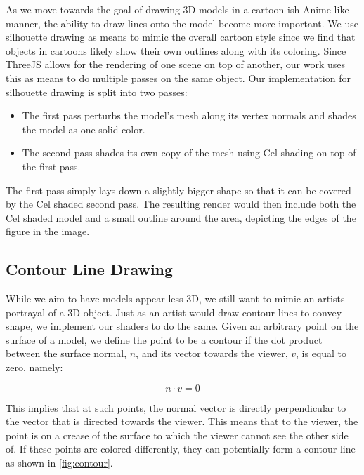 \documentclass[10pt,twocolumn,letterpaper]{article}
\begin{document}
As we move towards the goal of drawing 3D models in a cartoon-ish Anime-like manner, the ability to draw lines onto the model become more important. We use silhouette drawing as means to mimic the overall cartoon style since we find that objects in cartoons likely show their own outlines along with its coloring. Since ThreeJS allows for the rendering of one scene on top of another, our work uses this as means to do multiple passes on the same object. Our implementation for silhouette drawing is split into two passes:

\begin{itemize}
    \item The first pass perturbs the model's mesh along its vertex normals and shades the model as one solid color.
    \item The second pass shades its own copy of the mesh using Cel shading on top of the first pass.
\end{itemize}

The first pass simply lays down a slightly bigger shape so that it can be covered by the Cel shaded second pass. The resulting render would then include both the Cel shaded model and a small outline around the area, depicting the edges of the figure in the image.

\subsection{Contour Line Drawing}

While we aim to have models appear less 3D, we still want to mimic an artists portrayal of a 3D object. Just as an artist would draw contour lines to convey shape, we implement our shaders to do the same. Given an arbitrary point on the surface of a model, we define the point to be a contour if the dot product between the surface normal, $n$, and its vector towards the viewer, $v$, is equal to zero, namely:

\begin{equation}
    n \cdot v = 0
    \label{eq:contour}
\end{equation}

This implies that at such points, the normal vector is directly perpendicular to the vector that is directed towards the viewer. This means that to the viewer, the point is on a crease of the surface to which the viewer cannot see the other side of. If these points are colored differently, they can potentially form a contour line as shown in \cref{fig:contour}.
\end{document}
